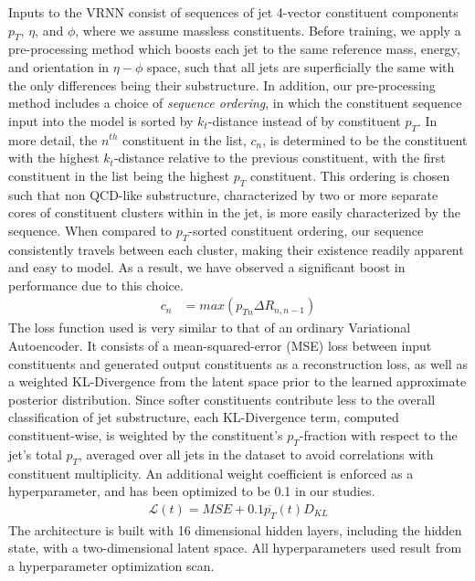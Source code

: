 \documentclass[letterpaper,11pt]{article}
\begin{document}
Inputs to the VRNN consist of sequences of jet 4-vector constituent components $p_{T}$, $\eta$, and $\phi$, where we assume massless constituents. Before training, we apply a pre-processing method which boosts each jet to the same reference mass, energy, and orientation in $\eta-\phi$ space, such that all jets are superficially the same with the only differences being their substructure. In addition, our pre-processing method includes a choice of \textit{sequence ordering}, in which the constituent sequence input into the model is sorted by $k_{t}$-distance instead of by constituent $p_{T}$. In more detail, the $n^{th}$ constituent in the list, $c_{n}$, is determined to be the constituent with the highest $k_{t}$-distance relative to the previous constituent, with the first constituent in the list being the highest $p_{T}$ constituent. This ordering is chosen such that non QCD-like substructure, characterized by two or more separate cores of constituent clusters within in the jet, is more easily characterized by the sequence. When compared to $p_{T}$-sorted constituent ordering, our sequence consistently travels between each cluster, making their existence readily apparent and easy to model. As a result, we have observed a significant boost in performance due to this choice.
\begin{align*}
c_{n} &= max(p_{Tn}\Delta R_{n, n-1})
\end{align*}
The loss function used is very similar to that of an ordinary Variational Autoencoder. It consists of a mean-squared-error (MSE) loss between input constituents and generated output constituents as a reconstruction loss, as well as a weighted KL-Divergence from the latent space prior to the learned approximate posterior distribution. Since softer constituents contribute less to the overall classification of jet substructure, each KL-Divergence term, computed constituent-wise, is weighted by the constituent's $p_{T}$-fraction with respect to the jet's total $p_{T}$, averaged over all jets in the dataset to avoid correlations with constituent multiplicity. An additional weight coefficient is enforced as a hyperparameter, and has been optimized to be 0.1 in our studies. 
\begin{align*}
\mathcal{L}(t)=MSE+0.1\overline{p_T}(t)D_{KL}
\end{align*}
The architecture is built with 16 dimensional hidden layers, including the hidden state, with a two-dimensional latent space. All hyperparameters used result from a hyperparameter optimization scan. 
\end{document}
